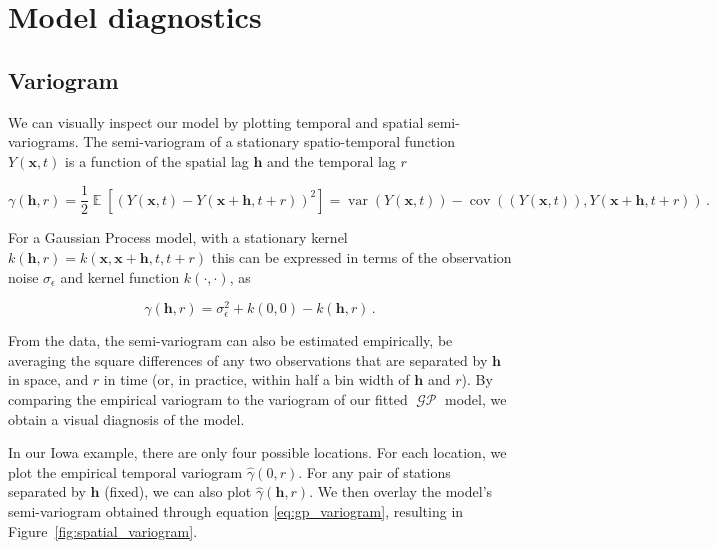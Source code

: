 \documentclass[letter]{article}
\newcommand{\genericdel}[3]{%
      \left#1#3\right#2
    }
\newcommand{\del}[1]{\genericdel(){#1}}
\newcommand{\sbr}[1]{\genericdel[]{#1}}
\DeclareMathOperator{\E}{\mathbb{E}}
\DeclareMathOperator{\cov}{{cov}}
\DeclareMathOperator{\var}{{var}}
\DeclareMathOperator{\GP}{\mathcal{GP}}
\newcommand{\xvec}{\mathbold{x}}
\newcommand{\hvec}{\mathbold{h}}
\newcommand{\sigman}{\sigma_{\epsilon}}
\begin{document}
        \section{Model diagnostics}\label{model-diagnostics}

\subsection{Variogram}\label{variogram}

We can visually inspect our model by plotting temporal and spatial semi-variograms. The semi-variogram of a stationary spatio-temporal function \(Y(\xvec,t)\) is a function of the spatial lag \(\hvec\) and the temporal lag \(r\)

\begin{equation}
    \gamma\del{\hvec,r} = \frac{1}{2} \E\sbr{\del{Y\del{\xvec,t}-Y\del{\xvec+\hvec,t+r}}^2} = \var\del{ Y\del{\xvec,t}} - \cov\del{ \del{Y\del{\xvec,t}} , Y\del{\xvec+\hvec,t+r}}\,.
\end{equation}

For a Gaussian Process model, with a stationary kernel \(k(\hvec,r)=k(\xvec,\xvec+\hvec,t,t+r)\) this can be expressed in terms of the observation noise \(\sigman\) and kernel function \(k(\cdot,\cdot)\), as

\begin{equation}
    \label{eq:gp_variogram}
    \gamma\del{\hvec,r} = \sigman^2 + k\del{0,0} - k(\hvec,r)\,.
\end{equation}

From the data, the semi-variogram can also be estimated empirically, be averaging the square differences of any two observations that are separated by \(\hvec\) in space, and \(r\) in time (or, in practice, within half a bin width of \(\hvec\) and \(r\)). By comparing the empirical variogram to the variogram of our fitted \(\GP\) model, we obtain a visual diagnosis of the model.

In our Iowa example, there are only four possible locations. For each location, we plot the empirical temporal variogram \(\hat\gamma\del{0,r}\). For any pair of stations separated by \(\hvec\) (fixed), we can also plot \(\hat\gamma\del{\hvec,r}\). We then overlay the model's semi-variogram obtained through equation \eqref{eq:gp_variogram}, resulting in Figure~\ref{fig:spatial_variogram}.
\end{document}
